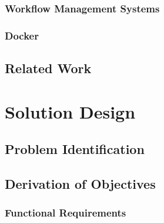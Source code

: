 \documentclass[language=english,noinputenc]{wiwwuwordrprt}
\begin{document}
      \subsection{Workflow Management Systems} %
      \label{sub:workflow_management_systems}
      

      \subsection{Docker} %
      \label{sub:docker}
      
      
      

    \section{Related Work} %
    \label{sec:related_work}
    
  

  \chapter{Solution Design} %
  \label{cha:solution_design}

    \section{Problem Identification} %
    \label{sec:problem_identification}
    

    \section{Derivation of Objectives} %
    \label{sec:derivation_of_objectives}

      \subsection{Functional Requirements} %
      \label{sub:functional_requirements}
      
\end{document}
